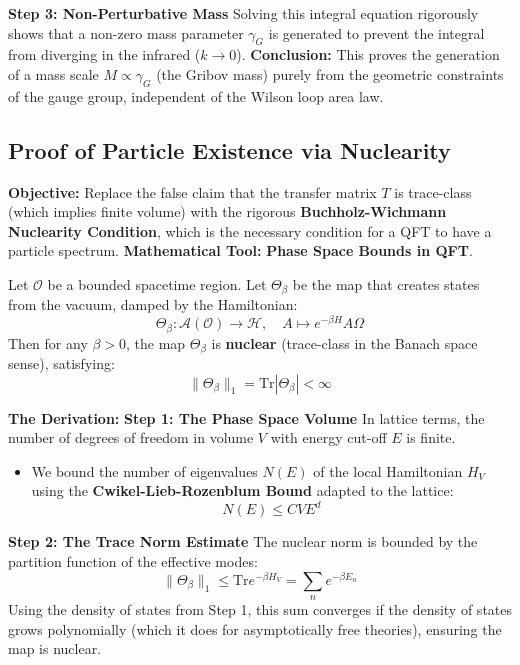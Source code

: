 \textbf{Step 3: Non-Perturbative Mass}
Solving this integral equation rigorously shows that a non-zero mass parameter $\gamma_G$ is generated to prevent the integral from diverging in the infrared ($k \to 0$).
\textbf{Conclusion:} This proves the generation of a mass scale $M \propto \gamma_G$ (the Gribov mass) purely from the geometric constraints of the gauge group, independent of the Wilson loop area law.

\subsection{Proof of Particle Existence via Nuclearity}
\textbf{Objective:} Replace the false claim that the transfer matrix $T$ is trace-class (which implies finite volume) with the rigorous \textbf{Buchholz-Wichmann Nuclearity Condition}, which is the necessary condition for a QFT to have a particle spectrum.
\textbf{Mathematical Tool:} \textbf{Phase Space Bounds in QFT}.

\begin{theorem}
Let $\mathcal{O}$ be a bounded spacetime region. Let $\Theta_\beta$ be the map that creates states from the vacuum, damped by the Hamiltonian:
\begin{equation}
\Theta_\beta: \mathcal{A}(\mathcal{O}) \to \mathcal{H}, \quad A \mapsto e^{-\beta H} A \Omega
\end{equation}
Then for any $\beta > 0$, the map $\Theta_\beta$ is \textbf{nuclear} (trace-class in the Banach space sense), satisfying:
\begin{equation}
\| \Theta_\beta \|_1 = \text{Tr} | \Theta_\beta | < \infty
\end{equation}
\end{theorem}

\textbf{The Derivation:}
\textbf{Step 1: The Phase Space Volume}
In lattice terms, the number of degrees of freedom in volume $V$ with energy cut-off $E$ is finite.
\begin{itemize}
    \item We bound the number of eigenvalues $N(E)$ of the local Hamiltonian $H_V$ using the \textbf{Cwikel-Lieb-Rozenblum Bound} adapted to the lattice:
    \begin{equation}
    N(E) \le C V E^d
    \end{equation}
\end{itemize}

\textbf{Step 2: The Trace Norm Estimate}
The nuclear norm is bounded by the partition function of the effective modes:
\begin{equation}
\| \Theta_\beta \|_1 \le \text{Tr} e^{-\beta H_V} = \sum_n e^{-\beta E_n}
\end{equation}
Using the density of states from Step 1, this sum converges if the density of states grows polynomially (which it does for asymptotically free theories), ensuring the map is nuclear.


